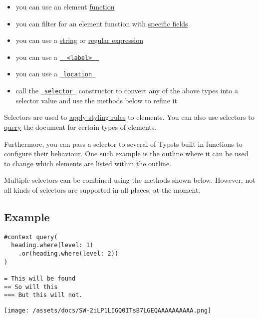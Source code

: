 \begin{itemize}
\tightlist
\item
  you can use an element
  \href{/docs/reference/foundations/function/}{function}
\item
  you can filter for an element function with
  \href{/docs/reference/foundations/function/\#definitions-where}{specific
  fields}
\item
  you can use a \href{/docs/reference/foundations/str/}{string} or
  \href{/docs/reference/foundations/regex/}{regular expression}
\item
  you can use a
  \href{/docs/reference/foundations/label/}{\texttt{\ }{\texttt{\ \textless{}label\textgreater{}\ }}\texttt{\ }}
\item
  you can use a
  \href{/docs/reference/introspection/location/}{\texttt{\ location\ }}
\item
  call the
  \href{/docs/reference/foundations/selector/}{\texttt{\ selector\ }}
  constructor to convert any of the above types into a selector value
  and use the methods below to refine it
\end{itemize}

Selectors are used to \href{/docs/reference/styling/\#show-rules}{apply
styling rules} to elements. You can also use selectors to
\href{/docs/reference/introspection/query/}{query} the document for
certain types of elements.

Furthermore, you can pass a selector to several of
Typst\textquotesingle s built-in functions to configure their behaviour.
One such example is the \href{/docs/reference/model/outline/}{outline}
where it can be used to change which elements are listed within the
outline.

Multiple selectors can be combined using the methods shown below.
However, not all kinds of selectors are supported in all places, at the
moment.

\subsection{Example}\label{example}

\begin{verbatim}
#context query(
  heading.where(level: 1)
    .or(heading.where(level: 2))
)

= This will be found
== So will this
=== But this will not.
\end{verbatim}

\texttt{[image: /assets/docs/SW-2iLP1LIGQ0ITsB7LGEQAAAAAAAAAA.png]}

